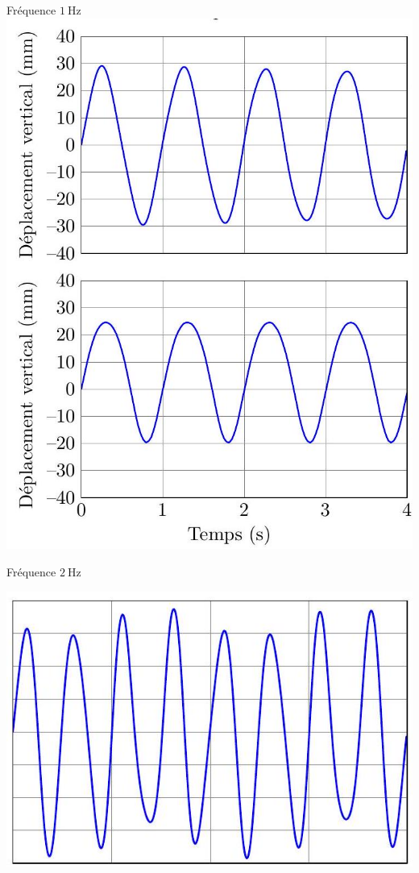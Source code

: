 \documentclass[10pt]{article}
\begin{document}
Fréquence $1 \mathrm{~Hz}$
\includegraphics[max width=\textwidth, center]{2022_12_31_ed674c1a831ea1bff3a0g-06}

Fréquence $2 \mathrm{~Hz}$

\begin{center}
\includegraphics[max width=\textwidth]{2022_12_31_ed674c1a831ea1bff3a0g-06(1)}
\end{center}
\end{document}
